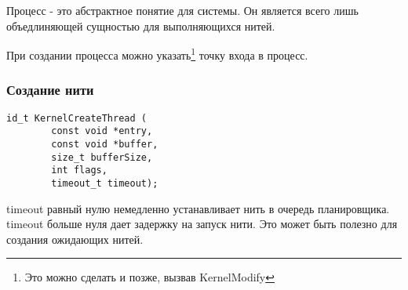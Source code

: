 Процесс - это абстрактное понятие для системы.
Он является всего лишь объедлиняющей сущностью для выполняющихся нитей.

При создании процесса можно указать\footnote{Это можно сделать и позже, вызвав
KernelModify} точку входа в процесс.

\subsubsection{Создание нити}

\begin{verbatim}
id_t KernelCreateThread (
        const void *entry,
        const void *buffer,
        size_t bufferSize,
        int flags,
        timeout_t timeout);
\end{verbatim}\par

timeout равный нулю немедленно устанавливает нить в очередь планировщика.
timeout больше нуля дает задержку на запуск нити. Это может быть полезно для
создания ожидающих нитей.

%
%
%
%
%

